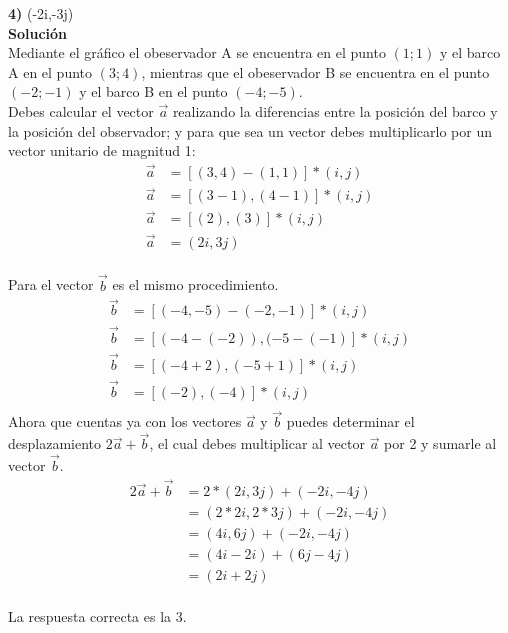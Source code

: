 \documentclass[11pt, a4paper]{article} %
\theoremstyle{dotlessP}
\theoremstyle{dotlessS}
\begin{document}
\begin{enumerate}[label=\color{dg}\theenumi.]
     {\color{dh} \textbf{4)} \quad (-2i,-3j)}   \vspace{1\baselineskip} \\ 	
      \)
        \textbf{Solución} 
\\ Mediante el gráfico el obeservador A se encuentra en el punto \((1; 1)\) y el barco A en el punto \((3; 4)\), mientras que el obeservador B se encuentra en el punto \((-2 ; -1)\) y el barco B en el punto \((-4; -5)\).
\\ Debes calcular el vector $\vec{a}$ realizando la diferencias entre la posición del barco y la posición del observador; y para que sea un vector debes multiplicarlo por un vector unitario de magnitud 1: 
\begin{align*}
\vec{a} &=[(3, 4)-(1, 1)]*(i,j)
\\
\vec{a} &=[(3-1),(4-1)]*(i,j)
\\
\vec{a} &=[(2),(3)]*(i,j)
\\
\vec{a} &=(2i,3j)
\end{align*}
\\ Para el vector $\vec{b}$ es el mismo procedimiento. 
\begin{align*}
\vec{b} &=[(-4, -5)-(-2, -1)]*(i,j)
\\
\vec{b} &=[(-4-(-2)),(-5-(-1)]*(i,j)
\\
\vec{b} &=[(-4+2),(-5+1)]*(i,j)
\\
\vec{b} &=[(-2),(-4)]*(i,j)
\\
\end{align*}
Ahora que cuentas ya con los vectores \(\vec {a}\) y \(\vec {b}\) puedes determinar el desplazamiento \(2 \vec{a} + \vec {b}\), el cual debes multiplicar al vector \(\vec {a}\) por 2 y sumarle al vector \(\vec {b}\).
\begin{align*}
2 \vec{a} + \vec{b} &=2*(2i,3j) + (-2i,-4j)
\\
&=(2*2i,2*3j) + (-2i,-4j)
\\
&=(4i,6j) + (-2i,-4j)
\\
&=(4i-2i) + (6j-4j)
\\
&=(2i + 2j)
\end{align*}
\\
{\color{dh} La respuesta correcta es la 3.}
\\
\end{enumerate}
\end{document}
